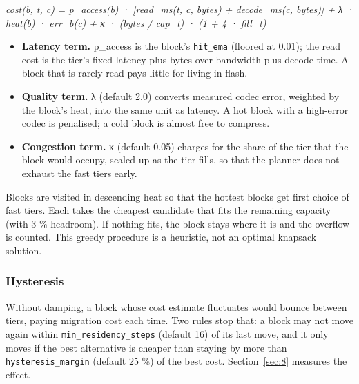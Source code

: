 \documentclass[12pt,a4paper]{report}
\begin{document}
\begin{center}\small\textit{cost(b, t, c) = p\_\allowbreak{}access(b) · [read\_\allowbreak{}ms(t, c, bytes) + decode\_\allowbreak{}ms(c, bytes)] + λ · heat(b) · err\_\allowbreak{}b(c) + κ · (bytes / cap\_\allowbreak{}t) · (1 + 4 · fill\_\allowbreak{}t)}\end{center}
\begin{itemize}
\item \textbf{Latency term.} p\_\allowbreak{}access is the block's \texttt{hit\_\allowbreak{}\allowbreak{}ema} (floored at 0.01); the read cost is the tier's fixed latency plus bytes over bandwidth plus decode time. A block that is rarely read pays little for living in flash.
\item \textbf{Quality term.} λ (default 2.0) converts measured codec error, weighted by the block's heat, into the same unit as latency. A hot block with a high-error codec is penalised; a cold block is almost free to compress.
\item \textbf{Congestion term.} κ (default 0.05) charges for the share of the tier that the block would occupy, scaled up as the tier fills, so that the planner does not exhaust the fast tiers early.
\end{itemize}
Blocks are visited in descending heat so that the hottest blocks get first choice of fast tiers. Each takes the cheapest candidate that fits the remaining capacity (with 3 \% headroom). If nothing fits, the block stays where it is and the overflow is counted. This greedy procedure is a heuristic, not an optimal knapsack solution.

\subsubsection{Hysteresis}\label{sec:5_6_1}
Without damping, a block whose cost estimate fluctuates would bounce between tiers, paying migration cost each time. Two rules stop that: a block may not move again within \texttt{min\_\allowbreak{}\allowbreak{}residency\_\allowbreak{}\allowbreak{}steps} (default 16) of its last move, and it only moves if the best alternative is cheaper than staying by more than \texttt{hysteresis\_\allowbreak{}\allowbreak{}margin} (default 25 \%) of the best cost. Section~\ref{sec:8} measures the effect.
\end{document}
